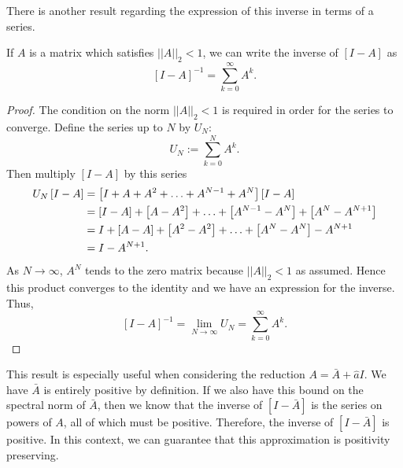 There is another result regarding the expression of this inverse in terms of a series.
\begin{lemma}
    If $A$ is a matrix which satisfies $||A||_2 < 1$, we can write the inverse of $[I-A]$ as
    \begin{equation*}
        \left[ I - A \right]^{-1} = \sum_{k=0}^{\infty} A^k.
    \end{equation*}
\end{lemma}
\begin{proof}
    The condition on the norm $||A||_2 < 1$ is required in order for the series to converge.
    Define the series up to $N$ by $U_N:$
    \begin{equation*}
        U_N := \sum_{k=0}^{N} A^k.
    \end{equation*}
    Then multiply $[I-A]$ by this series
    \begin{align*}
        U_N \left[ I-A \right] &= \left[ I + A + A^2 + \mathellipsis + A^{N-1} + A^N \right] \left[ I - A \right] \\
        &= [I-A] + \left[ A-A^2 \right] + \mathellipsis + \left[ A^{N-1} - A^N \right] + \left[ A^N - A^{N+1} \right] \\
        &= I + [A-A] + \left[ A^2 - A^2 \right] + \mathellipsis + \left[ A^N - A^N \right] - A^{N+1} \\
        &= I - A^{N+1}.
    \end{align*}
    As $N \rightarrow \infty$, $A^N$ tends to the zero matrix because $||A||_2 < 1$ as assumed.
    Hence this product converges to the identity and we have an expression for the inverse.
    Thus,
    \begin{equation*}
        \left[ I - A \right]^{-1} = \lim_{N\rightarrow \infty}U_N = \sum_{k=0}^{\infty} A^k.
    \end{equation*}
\end{proof}
This result is especially useful when considering the reduction $A = \bar{A} + \hat{a}I$.
We have $\bar{A}$ is entirely positive by definition.
If we also have this bound on the spectral norm of $\bar{A}$,
then we know that the inverse of $[I-\bar{A}]$ is the series on powers of $A$, all of which must be positive.
Therefore, the inverse of $[I-\bar{A}]$ is positive.
In this context, we can guarantee that this approximation is positivity preserving.

